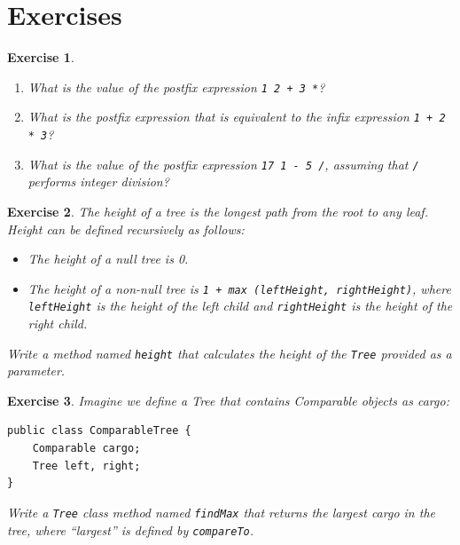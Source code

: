 \documentclass[12pt]{book}
\theoremstyle{exercise}
\newtheorem{exercise}{Exercise}[chapter]
\begin{document}
\section{Exercises}

\begin{exercise}
\begin{enumerate}

\item What is the value of the postfix expression 
{\tt 1 2 + 3 *}?

\item What is the postfix expression that is equivalent to
the infix expression {\tt 1 + 2 * 3}?

\item What is the value of the postfix expression 
{\tt 17 1 - 5 /}, assuming that {\tt /} performs integer division? 

\end{enumerate}
\end{exercise}


\begin{exercise}
\label{ex.height}
The height of a tree is the longest path from the root to
any leaf.  Height can be defined recursively as follows:

\begin{itemize}

\item The height of a null tree is 0.

\item The height of a non-null tree is {\tt 1 + max (leftHeight, rightHeight)},
where {\tt leftHeight} is the height of the left child and {\tt rightHeight}
is the height of the right child.

\end{itemize}

Write a method named {\tt height} that calculates the height of
the {\tt Tree} provided as a parameter.
\end{exercise}


\begin{exercise}
Imagine we define a Tree that contains Comparable objects as
cargo:

\begin{verbatim}
public class ComparableTree {
    Comparable cargo;
    Tree left, right;
}
\end{verbatim}

Write a {\tt Tree} class method named {\tt findMax}
that returns the largest cargo in
the tree, where ``largest'' is defined by {\tt compareTo}.
\end{exercise}
\end{document}
